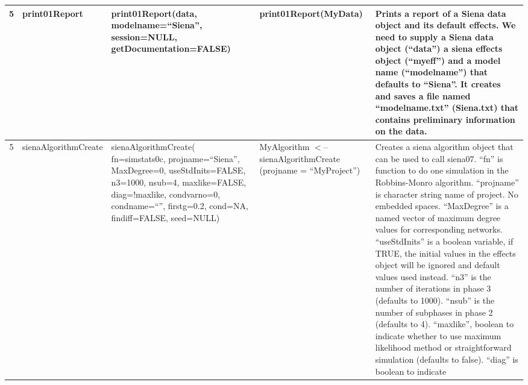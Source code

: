 \documentclass[a4paper,fleqn,11pt]{article}
\newcommand{\+}{\, + \,}
\begin{document}
\begin{landscape}
\begin{small}
\begin{longtable}{c | p{2.4cm} | p{4.5cm} | p{4.0cm} | p{9.0cm} }
5 & print01Report & print01Report(data, modelname=``Siena'',\newline
session=NULL, \newline
getDocumentation=FALSE) & print01Report(MyData) & Prints a
report of a Siena data object and its default effects. We need to supply a
Siena data object (``data'') a siena effects object (``myeff'') and a model
name (``modelname'') that defaults to ``Siena''. It creates and saves a file
named ``modelname.txt'' (Siena.txt) that contains preliminary information
on the data.\\
\hline

5 & sienaAlgorithmCreate & sienaAlgorithmCreate(\newline
fn=simstats0c,\newline
projname=``Siena'', \newline
MaxDegree=0, \newline
useStdInits=FALSE, n3=1000, \newline
nsub=4, maxlike=FALSE, \newline
diag=!maxlike, \newline
condvarno=0, \newline
condname=``'', firstg=0.2, \newline
cond=NA, findiff=FALSE, \newline
seed=NULL) &
\newline
MyAlgorithm $<$-- sienaAlgorithmCreate \newline
(projname = \newline
``MyProject'') & Creates a siena algorithm
object that can be used to call siena07. ``fn'' is function to do one
simulation in the Robbins-Monro algorithm.
``projname'' is character string name of
project. No embedded spaces. ``MaxDegree'' is a named vector of maximum degree
values for corresponding networks. ``useStdInits'' is a boolean variable, if
TRUE, the initial values in the effects object will be ignored and default
values used instead. ``n3'' is the number of iterations in phase 3 (defaults to
1000). ``nsub'' is the number of subphases in phase 2 (defaults to 4).
``maxlike'', boolean to indicate whether to use maximum likelihood method or
straightforward simulation (defaults to false). ``diag'' is boolean to indicate

\end{longtable}
\end{small}
\end{landscape}
\end{document}
